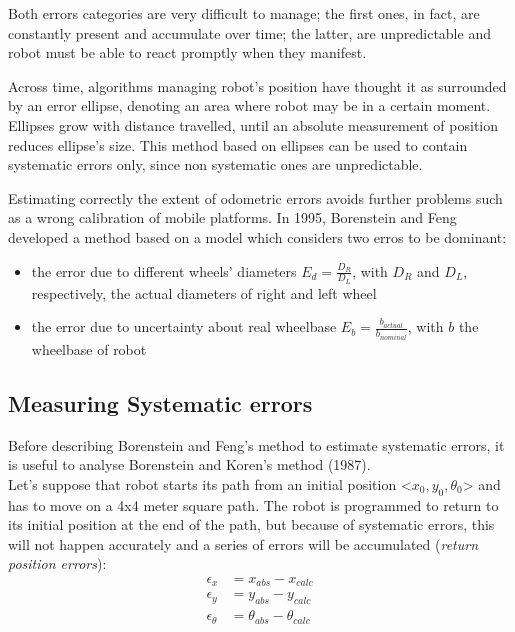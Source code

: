 \documentclass[a4paper, onecolumn]{report}
\begin{document}
Both errors categories are very difficult to manage; the first ones, in fact, are constantly present and accumulate over time; the latter, are unpredictable and robot must be able to react promptly when they manifest.

Across time, algorithms managing robot's position have thought it as surrounded by an error ellipse, denoting an area where robot may be in a certain moment. Ellipses grow with distance travelled, until an absolute measurement of position reduces ellipse's size. This method based on ellipses can be used to contain systematic errors only, since non systematic ones are unpredictable.

Estimating correctly the extent of odometric errors avoids further problems such as a wrong calibration of mobile platforms. In 1995, Borenstein and Feng developed a method based on a model which considers two erros to be dominant:
\begin{itemize}
	\item{the error due to different wheels' diameters $E_d = \frac{D_R}{D_L}$, with $D_R$ and $D_L$, respectively, the actual diameters of right and left wheel}
	\item{the error due to uncertainty about real wheelbase $E_b = \frac{b_{actual}}{b_{nominal}}$, with $b$ the wheelbase of robot}
\end{itemize}

\subsection{Measuring Systematic errors}
Before describing Borenstein and Feng's method to estimate systematic errors, it is useful to analyse Borenstein and Koren's method (1987). \\
Let's suppose that robot starts its path from an initial position <$x_0, y_0, \theta_0$> and has to move on a 4x4 meter square path. The robot is programmed to return to its initial position at the end of the path, but because of systematic errors, this will not happen accurately and a series of errors will be accumulated (\emph{return position errors}):
\begin{equation}
	\begin{aligned}
		\epsilon_{x} &= x_{abs}-x_{calc} \\
		\epsilon_{y} &= y_{abs}-y_{calc} \\
		\epsilon_{\theta} &= \theta_{abs}-\theta_{calc}
	\end{aligned}
\end{equation}
\end{document}
